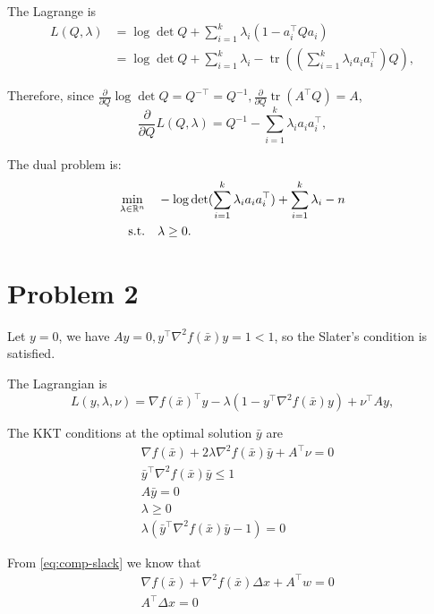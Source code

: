 \documentclass[11pt]{article}
\newcommand{\grad}{\nabla}
\newcommand{\hess}{\nabla^2}
\newcommand{\T}{^\top}          %
\begin{document}
The Lagrange is
$$
\begin{aligned}
L(Q, \lambda) & =\log \operatorname{det} Q+\sum_{i=1}^k \lambda_i(1-a_i^{\top} Q a_i) \\
& =\log \operatorname{det} Q+\sum_{i=1}^k \lambda_i-\operatorname{tr}((\sum_{i=1}^k \lambda_i a_i a_i^{\top}) Q),
\end{aligned}
$$


Therefore, since $\frac{\partial}{\partial Q} \log \operatorname{det} Q=Q^{-\top}=Q^{-1}, \frac{\partial}{\partial Q} \operatorname{tr}\left(A^{\top} Q\right)=A$,
$$
\frac{\partial}{\partial Q} L(Q, \lambda)=Q^{-1}-\sum_{i=1}^k \lambda_i a_i a_i^{\top},
$$


The dual problem is:
\begin{align*}
  \min_{\lambda\in{{\mathbb{R}}}^n} \quad & -\log \operatorname{det}(\sum_{i=1}^k \lambda_i a_i a_i^{\top})+\sum_{i=1}^k \lambda_i-n\\
  \text{s.t.}\quad & \lambda \geq 0.
\end{align*}



\clearpage
\section*{Problem 2}

Let $y=0$, we have $Ay = 0, y\T \hess f(\bar{x})y = 1 < 1$, so the Slater's condition is satisfied.

The Lagrangian is
\[
  L(y, \lambda, \nu) = \grad f(\bar{x})\T y - \lambda(1 - y\T \hess f(\bar{x})y) + \nu\T Ay,
\]

The KKT conditions at the optimal solution $\bar{y}$ are
\begin{align}
  & \grad f(\bar{x}) + 2\lambda\hess f(\bar{x})\bar{y} + A\T \nu = 0\label{eq:lag-grad}\\
  & \bar{y}\T\hess f(\bar{x})\bar{y}\leq 1\label{eq:primal-ineq}\\
  & A\bar{y} = 0\\
  & \lambda \geq 0\label{eq:dual-ineq}\\
  & \lambda (\bar{y}\T\hess f(\bar{x})\bar{y} - 1) = 0\label{eq:comp-slack}
\end{align}

From \eqref{eq:comp-slack} we know that
\begin{align*}
  &\grad f(\bar{x}) + \hess f(\bar{x}) \Delta x + A\T w = 0\\
  &A\T \Delta x = 0
\end{align*}
\end{document}
